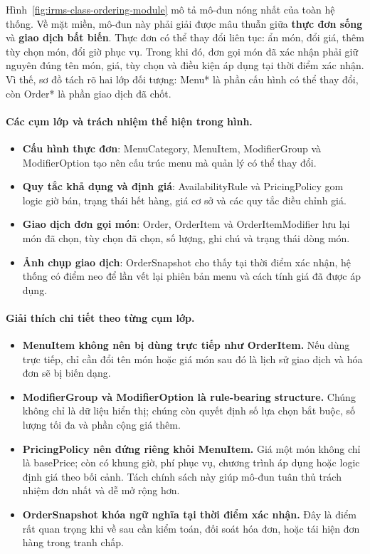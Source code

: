 \documentclass[11pt,a4paper]{article}
\begin{document}
Hình~\ref{fig:irms-class-ordering-module} mô tả mô-đun nóng nhất của toàn hệ thống. Về mặt miền, mô-đun này phải giải được mâu thuẫn giữa \textbf{thực đơn sống} và \textbf{giao dịch bất biến}. Thực đơn có thể thay đổi liên tục: ẩn món, đổi giá, thêm tùy chọn món, đổi giờ phục vụ. Trong khi đó, đơn gọi món đã xác nhận phải giữ nguyên đúng tên món, giá, tùy chọn và điều kiện áp dụng tại thời điểm xác nhận. Vì thế, sơ đồ tách rõ hai lớp đối tượng: \textsf{Menu*} là phần cấu hình có thể thay đổi, còn \textsf{Order*} là phần giao dịch đã chốt.

\paragraph{Các cụm lớp và trách nhiệm thể hiện trong hình.}
\begin{itemize}
  \item \textbf{Cấu hình thực đơn}: \textsf{MenuCategory}, \textsf{MenuItem}, \textsf{ModifierGroup} và \textsf{ModifierOption} tạo nên cấu trúc menu mà quản lý có thể thay đổi.
  \item \textbf{Quy tắc khả dụng và định giá}: \textsf{AvailabilityRule} và \textsf{PricingPolicy} gom logic giờ bán, trạng thái hết hàng, giá cơ sở và các quy tắc điều chỉnh giá.
  \item \textbf{Giao dịch đơn gọi món}: \textsf{Order}, \textsf{OrderItem} và \textsf{OrderItemModifier} lưu lại món đã chọn, tùy chọn đã chọn, số lượng, ghi chú và trạng thái dòng món.
  \item \textbf{Ảnh chụp giao dịch}: \textsf{OrderSnapshot} cho thấy tại thời điểm xác nhận, hệ thống có điểm neo để lần vết lại phiên bản menu và cách tính giá đã được áp dụng.
\end{itemize}

\paragraph{Giải thích chi tiết theo từng cụm lớp.}
\begin{itemize}
  \item \textbf{MenuItem không nên bị dùng trực tiếp như OrderItem.} Nếu dùng trực tiếp, chỉ cần đổi tên món hoặc giá món sau đó là lịch sử giao dịch và hóa đơn sẽ bị biến dạng.
  \item \textbf{ModifierGroup và ModifierOption là rule-bearing structure.} Chúng không chỉ là dữ liệu hiển thị; chúng còn quyết định số lựa chọn bắt buộc, số lượng tối đa và phần cộng giá thêm.
  \item \textbf{PricingPolicy nên đứng riêng khỏi MenuItem.} Giá một món không chỉ là \textsf{basePrice}; còn có khung giờ, phí phục vụ, chương trình áp dụng hoặc logic định giá theo bối cảnh. Tách chính sách này giúp mô-đun tuân thủ trách nhiệm đơn nhất và dễ mở rộng hơn.
  \item \textbf{OrderSnapshot khóa ngữ nghĩa tại thời điểm xác nhận.} Đây là điểm rất quan trọng khi về sau cần kiểm toán, đối soát hóa đơn, hoặc tái hiện đơn hàng trong tranh chấp.
\end{itemize}
\end{document}
